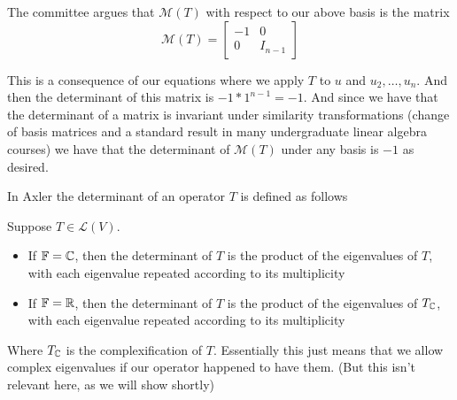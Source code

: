 \documentclass[answers]{exam}
\renewcommand{\L}[1]{\mathcal{L}\left(#1\right)}
\newcommand{\M}[1]{\mathcal{M}\left(#1\right)}
\begin{document}
\begin{questions}
\begin{parts}
\begin{solution}
            
            
            The committee argues that $\M{T}$ with respect to our above basis is the matrix
            \[
                \M{T} = \begin{bmatrix}
                    -1 & 0 \\
                    0  & I_{n-1}
                \end{bmatrix}
            \]

            This is a consequence of our equations where we apply $T$ to $u$ and $u_2,\dots,u_n$. And then the
            determinant of this matrix is $-1*1^{n-1} = -1$. And since we have that the determinant of a matrix
            is invariant under similarity transformations (change of basis matrices and a standard result in 
            many undergraduate linear algebra courses) we have that the determinant of $\M{T}$ under any 
            basis is $-1$ as desired.


            In Axler the determinant of an operator $T$ is defined as follows
            \begin{defin}
                Suppose $T\in\L{V}$.
                \begin{itemize}
                    \item If $\mathbb{F} = \mathbb{C}$, then the determinant of $T$ is the product of the eigenvalues of $T$,
                        with each eigenvalue repeated according to its multiplicity
                    \item If $\mathbb{F} = \mathbb{R}$, then the determinant of $T$ is the product of the eigenvalues of $T_{\mathbb{C}}$,
                        with each eigenvalue repeated according to its multiplicity
                \end{itemize}
            \end{defin}
            Where $T_{\mathbb{C}}$ is the complexification of $T$. Essentially this just means that we allow complex 
            eigenvalues if our operator happened to have them. (But this isn't relevant here, as we will 
            show shortly)


\end{solution}
\end{parts}
\end{questions}
\end{document}

